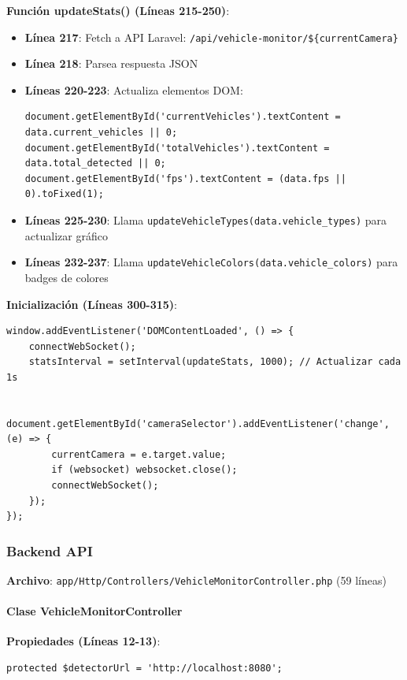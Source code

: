 \textbf{Función updateStats() (Líneas 215-250)}:
\begin{itemize}
    \item \textbf{Línea 217}: Fetch a API Laravel: \texttt{/api/vehicle-monitor/\$\{currentCamera\}}
    \item \textbf{Línea 218}: Parsea respuesta JSON
    \item \textbf{Líneas 220-223}: Actualiza elementos DOM:
    \begin{lstlisting}[style=jsstyle]
document.getElementById('currentVehicles').textContent = data.current_vehicles || 0;
document.getElementById('totalVehicles').textContent = data.total_detected || 0;
document.getElementById('fps').textContent = (data.fps || 0).toFixed(1);
    \end{lstlisting}
    \item \textbf{Líneas 225-230}: Llama \texttt{updateVehicleTypes(data.vehicle\_types)} para actualizar gráfico
    \item \textbf{Líneas 232-237}: Llama \texttt{updateVehicleColors(data.vehicle\_colors)} para badges de colores
\end{itemize}

\textbf{Inicialización (Líneas 300-315)}:
\begin{lstlisting}[style=jsstyle, caption={Inicialización del Módulo}]
window.addEventListener('DOMContentLoaded', () => {
    connectWebSocket();
    statsInterval = setInterval(updateStats, 1000); // Actualizar cada 1s
    
    document.getElementById('cameraSelector').addEventListener('change', (e) => {
        currentCamera = e.target.value;
        if (websocket) websocket.close();
        connectWebSocket();
    });
});
\end{lstlisting}

\subsubsection{Backend API}

\textbf{Archivo}: \texttt{app/Http/Controllers/VehicleMonitorController.php} (59 líneas)

\paragraph{Clase VehicleMonitorController}

\textbf{Propiedades (Líneas 12-13)}:
\begin{lstlisting}[style=phpstyle]
protected $detectorUrl = 'http://localhost:8080';
\end{lstlisting}

